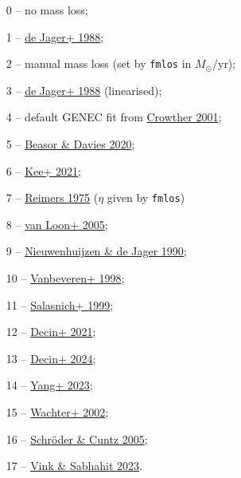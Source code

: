 \documentclass[11pt]{article}
\def\msol{\ensuremath{M_\odot}}
\begin{document}
\begin{description}
\begin{description}
          \begin{enumerate}[labelindent=.5cm,font=\ttfamily \bfseries,label=\arabic*]
            \item[0] -- no mass loss;
            \item[1] -- \href{https://ui.adsabs.harvard.edu/abs/1988A&AS...72..259D}{de Jager+ 1988};
            \item[2] -- manual mass loss (set by \texttt{fmlos} in \msol/yr);
            \item[3] -- \href{https://ui.adsabs.harvard.edu/abs/1988A&AS...72..259D}{de Jager+ 1988} (linearised);
            \item[4] -- default GENEC fit from \href{https://ui.adsabs.harvard.edu/abs/2001ASSL..264..215C}{Crowther 2001};
            \item[5] -- \href{https://ui.adsabs.harvard.edu/abs/2020MNRAS.492.5994B}{Beasor \& Davies 2020};
            \item[6] -- \href{https://ui.adsabs.harvard.edu/abs/2021A&A...646A.180K}{Kee+ 2021};
            \item[7] -- \href{https://ui.adsabs.harvard.edu/abs/1975MSRSL...8..369R}{Reimers 1975} ($\eta$ given by \texttt{fmlos})
            \item[8] -- \href{https://ui.adsabs.harvard.edu/abs/2005A&A...438..273V}{van Loon+ 2005};
            \item[9] -- \href{https://ui.adsabs.harvard.edu/abs/1990A&A...231..134N}{Nieuwenhuijzen \& de Jager 1990};
            \item[10] -- \href{https://ui.adsabs.harvard.edu/abs/1998NewA....3..443V}{Vanbeveren+ 1998};
            \item[11] -- \href{https://ui.adsabs.harvard.edu/abs/1999A&A...342..131S}{Salasnich+ 1999};
            \item[12] -- \href{https://ui.adsabs.harvard.edu/abs/2021ARA&A..59..337D}{Decin+ 2021};
            \item[13] -- \href{https://ui.adsabs.harvard.edu/abs/2024A&A...681A..17D}{Decin+ 2024};
            \item[14] -- \href{https://ui.adsabs.harvard.edu/abs/2023A&A...676A..84Y}{Yang+ 2023};
            \item[15] -- \href{https://ui.adsabs.harvard.edu/abs/2002A&A...384..452W}{Wachter+ 2002};
            \item[16] -- \href{https://ui.adsabs.harvard.edu/abs/2005ApJ...630L..73S}{Schr\"oder \& Cuntz 2005};
            \item[17] -- \href{https://ui.adsabs.harvard.edu/abs/2023A&A...678L...3V}{Vink \& Sabhahit 2023}.

\end{enumerate}
\end{description}
\end{description}
\end{document}
